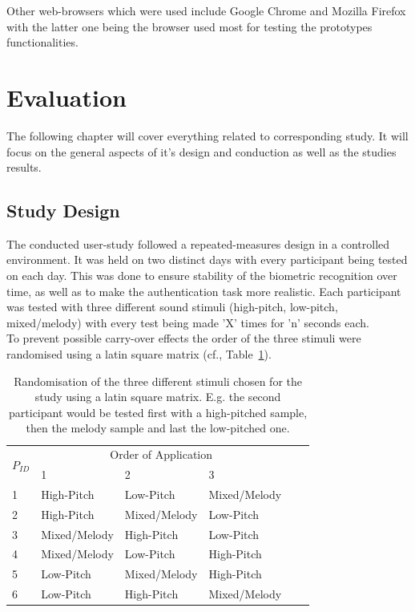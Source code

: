 Other web-browsers which were used include Google Chrome and Mozilla Firefox with the latter one being the browser used most for testing the prototypes functionalities.

\section{Evaluation}
The following chapter will cover everything related to corresponding study. 
It will focus on the general aspects of it's design and conduction as well as the studies results.

\subsection{Study Design}
The conducted user-study followed a repeated-measures design in a controlled environment.
It was held on two distinct days with every participant being tested on each day.
This was done to ensure stability of the biometric recognition over time, as well as to make the authentication task more realistic.
Each participant was tested with three different sound stimuli (high-pitch, low-pitch, mixed/melody) with every test being made 'X' times for 'n' seconds each.\\
To prevent possible carry-over effects the order of the three stimuli were randomised using a latin square matrix (cf., Table~\ref{tbl:lat_sqr}).

\begin{table}[H]
	\centering
	\label{tbl:lat_sqr}
	\caption{Randomisation of the three different stimuli chosen for the study using a latin square matrix. E.g. the second participant would be tested first with a high-pitched sample, then the melody sample and last the low-pitched one.}
	\begin{tabular}{p{1cm}llllp{1cm}}
		\toprule%
		\multirow{2}{*}{$P_{ID}$} & \multicolumn{3}{c}{Order of Application}\\%
		{} & 1 & 2 & 3 \\%
		\midrule%
		1 & High-Pitch & Low-Pitch & Mixed/Melody \\%
		2 & High-Pitch & Mixed/Melody & Low-Pitch \\%
		3 & Mixed/Melody & High-Pitch & Low-Pitch \\%
		4 & Mixed/Melody & Low-Pitch & High-Pitch \\%
		5 & Low-Pitch & Mixed/Melody & High-Pitch \\%
		6 & Low-Pitch & High-Pitch & Mixed/Melody \\%
		\bottomrule%
	\end{tabular}
\end{table}


